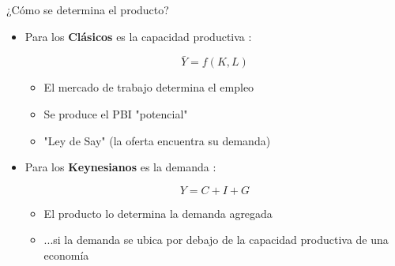 \documentclass{beamer}
\begin{document}
\begin{frame}{¿Cómo se determina el producto?}

    \begin{itemize}
        \item Para los \textbf{Clásicos} es la capacidad productiva \faCogs:
            \begin{center}
            \begin{boxA}
                    $$ \bar{Y}=f(K, L) $$
             \end{boxA}
             \end{center}
             
            \begin{itemize}
            \item El mercado de trabajo determina el empleo
            \item Se produce el PBI "potencial"
              \item "Ley de Say" (la oferta encuentra su demanda)
            \end{itemize}
        
        \item Para los \textbf{Keynesianos} es la demanda \faShoppingBasket:
            
            \begin{center}
            \begin{boxA}
                    $$ Y = C + I + G $$
             \end{boxA}
             \end{center}
             
            \begin{itemize}
            \item El producto lo determina la demanda agregada
            \item ...si la demanda se ubica por debajo de la capacidad productiva de una economía
            \end{itemize}
    \end{itemize}
\end{frame}
\end{document}
